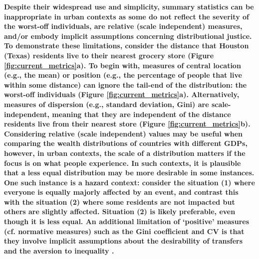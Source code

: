 \documentclass[final,3p,times,onecolumn,sort&compress]{elsarticle}
\begin{document}
\textbf{Despite their widespread use and simplicity, summary statistics can be inappropriate in urban contexts as some do not reflect the severity of the worst-off individuals, are relative (scale independent) measures, and/or embody implicit assumptions concerning distributional justice. 
To demonstrate these limitations, consider the distance that Houston (Texas) residents live to their nearest grocery store (Figure \ref{fig:current_metrics}a). 
To begin with, measures of central location (e.g., the mean) or position (e.g., the percentage of people that live within some distance) can ignore the tail-end of the distribution: the worst-off individuals (Figure \ref{fig:current_metrics}a). 
Alternatively, measures of dispersion (e.g., standard deviation, Gini) are scale-independent, meaning that they are independent of the distance residents live from their nearest store (Figure \ref{fig:current_metrics}b).
Considering relative (scale independent) values may be useful when comparing the wealth distributions of countries with different GDPs, however, in urban contexts, the scale of a distribution matters if the focus is on what people experience. 
In such contexts, it is plausible that a less equal distribution may be more desirable in some instances.
One such instance is a hazard context: consider the situation (1) where everyone is equally majorly affected by an event, and contrast this with the situation (2) where some residents are not impacted but others are slightly affected.
Situation (2) is likely preferable, even though it is less equal.
An additional limitation of ‘positive’ measures (cf. normative measures) such as the Gini coefficient and CV is that they involve implicit assumptions about the desirability of transfers and the aversion to inequality \citep{Maguire2011-fi, Atkinson1970-mr, Adger1997-tu}.}
\end{document}
